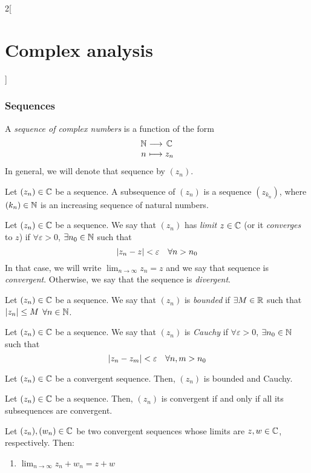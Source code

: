 \documentclass[../../../main.tex]{subfiles}
\begin{document}
\begin{multicols}{2}[\section{Complex analysis}]
  \subsubsection{Sequences}
  \begin{definition}
    A \textit{sequence of complex numbers} is a function of the form $$\function{}{\NN}{\CC}{n}{z_n}$$ In general, we will denote that sequence by $(z_n)$.
  \end{definition}
  \begin{definition}
    Let $(z_n)\in\mathbb{C}$ be a sequence. A subsequence of $(z_n)$ is a sequence $(z_{k_n})$, where $(k_n)\in\mathbb{N}$ is an increasing sequence of natural numbers.
  \end{definition}
  \begin{definition}
    Let $(z_n)\in\mathbb{C}$ be a sequence. We say that $(z_n)$ has \emph{limit} $z\in\mathbb{C}$ (or it \textit{converges} to $z$) if $\forall\varepsilon>0$, $\exists n_0\in\mathbb{N}$ such that $$\abs{z_n - z} < \varepsilon\quad \forall n > n_0$$ In that case, we will write $\displaystyle\lim_{n \to \infty} z_n = z$ and we say that sequence is \emph{convergent}. Otherwise, we say that the sequence is \emph{divergent}.
  \end{definition}
  \begin{definition}
    Let $(z_n)\in\mathbb{C}$ be a sequence. We say that $(z_n)$ is \emph{bounded} if $\exists M\in\mathbb{R}$ such that $\abs{z_n}\leq M$ $\forall n\in\mathbb{N}$.
  \end{definition}
  \begin{definition}
    Let $(z_n)\in\mathbb{C}$ be a sequence. We say that $(z_n)$ is \emph{Cauchy} if $\forall\varepsilon>0$, $\exists n_0\in\mathbb{N}$ such that $$\abs{z_n - z_m} < \varepsilon\quad \forall n,m > n_0$$
  \end{definition}
  \begin{proposition}
    Let $(z_n)\in\mathbb{C}$ be a convergent sequence. Then, $(z_n)$ is bounded and Cauchy.
  \end{proposition}
  \begin{proposition}
    Let $(z_n)\in\mathbb{C}$ be a sequence. Then, $(z_n)$ is convergent if and only if all its subsequences are convergent.
  \end{proposition}
  \begin{proposition}
    Let $(z_n),(w_n)\in\mathbb{C}$ be two convergent sequences whose limits are $z,w\in \mathbb{C}$, respectively. Then:
    \begin{enumerate}
      \item $\displaystyle\lim_{n\to\infty}z_n+w_n=z+w$

\end{enumerate}
\end{proposition}
\end{multicols}
\end{document}
